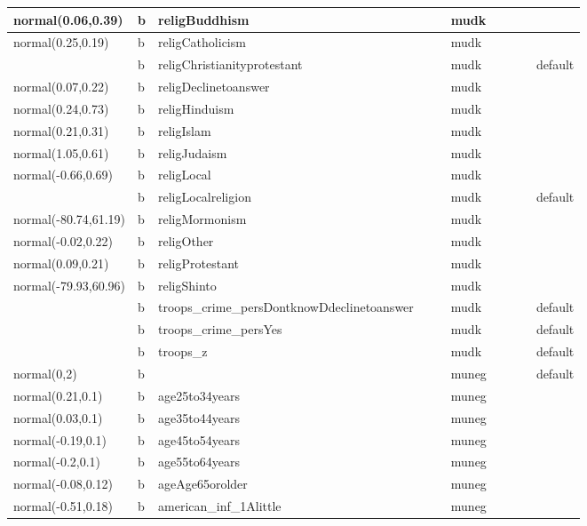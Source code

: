 \documentclass[
]{book}
\theoremstyle{definition}
\theoremstyle{definition}
\theoremstyle{definition}
\theoremstyle{definition}
\theoremstyle{remark}
\begin{document}
\begin{table}
\begin{tabular}[t]{l|l|l|l|l|l|l|l|l|l}
\hline
normal(0.06,0.39) & b & religBuddhism &  &  & mudk &  &  &  & \\
\hline
normal(0.25,0.19) & b & religCatholicism &  &  & mudk &  &  &  & \\
\hline
 & b & religChristianityprotestant &  &  & mudk &  &  &  & default\\
\hline
normal(0.07,0.22) & b & religDeclinetoanswer &  &  & mudk &  &  &  & \\
\hline
normal(0.24,0.73) & b & religHinduism &  &  & mudk &  &  &  & \\
\hline
normal(0.21,0.31) & b & religIslam &  &  & mudk &  &  &  & \\
\hline
normal(1.05,0.61) & b & religJudaism &  &  & mudk &  &  &  & \\
\hline
normal(-0.66,0.69) & b & religLocal &  &  & mudk &  &  &  & \\
\hline
 & b & religLocalreligion &  &  & mudk &  &  &  & default\\
\hline
normal(-80.74,61.19) & b & religMormonism &  &  & mudk &  &  &  & \\
\hline
normal(-0.02,0.22) & b & religOther &  &  & mudk &  &  &  & \\
\hline
normal(0.09,0.21) & b & religProtestant &  &  & mudk &  &  &  & \\
\hline
normal(-79.93,60.96) & b & religShinto &  &  & mudk &  &  &  & \\
\hline
 & b & troops\_crime\_persDontknowDdeclinetoanswer &  &  & mudk &  &  &  & default\\
\hline
 & b & troops\_crime\_persYes &  &  & mudk &  &  &  & default\\
\hline
 & b & troops\_z &  &  & mudk &  &  &  & default\\
\hline
normal(0,2) & b &  &  &  & muneg &  &  &  & default\\
\hline
normal(0.21,0.1) & b & age25to34years &  &  & muneg &  &  &  & \\
\hline
normal(0.03,0.1) & b & age35to44years &  &  & muneg &  &  &  & \\
\hline
normal(-0.19,0.1) & b & age45to54years &  &  & muneg &  &  &  & \\
\hline
normal(-0.2,0.1) & b & age55to64years &  &  & muneg &  &  &  & \\
\hline
normal(-0.08,0.12) & b & ageAge65orolder &  &  & muneg &  &  &  & \\
\hline
normal(-0.51,0.18) & b & american\_inf\_1Alittle &  &  & muneg &  &  &  & \\
\hline

\end{tabular}
\end{table}
\end{document}
